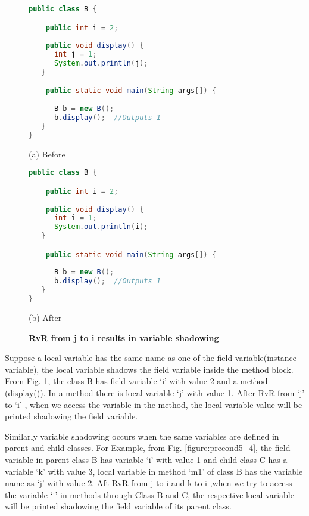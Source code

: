 \begin{figure}[th]
\centering
\begin{minipage}[t]{0.8\linewidth}
\begin{lstlisting}[language=java, basicstyle=\scriptsize\ttfamily,frame=single]
public class B {

    public int i = 2;
    
    public void display() {
      int j = 1;
      System.out.println(j); 		
   }

    public static void main(String args[]) {
    
      B b = new B();
      b.display();	//Outputs 1
   }
}
\end{lstlisting}
\centering(a) Before 
\end{minipage}
\hfill
\begin{minipage}[t]{0.8\linewidth}
\begin{lstlisting}[language=java, basicstyle=\scriptsize\ttfamily,frame=single]
public class B {

    public int i = 2;
    
    public void display() {
      int i = 1;
      System.out.println(i); 		
   }

    public static void main(String args[]) {
    
      B b = new B();
      b.display();	//Outputs 1
   }
}
\end{lstlisting}
\centering(b) After 
\end{minipage}
\caption{\textbf{RvR from j to i results in variable shadowing}}
\label{figure:precond5_3}
\end{figure}


Suppose a local variable has the same name as one of the field variable(instance variable), the local variable shadows the field variable inside the method block. From Fig. \ref{figure:precond5_3}, the class B has field variable `i' with value 2 and a method (display()). In a method there is local variable `j' with value 1. After RvR from `j' to `i' , when we access the variable in the method, the local variable value will be printed shadowing the field variable.

Similarly variable shadowing occurs when the same variables are defined in parent and child classes.
For Example, from Fig. \ref{figure:precond5_4}, the field variable  in parent class B has variable `i' with value 1 and child class C has a variable `k' with value 3, local variable in method `m1' of class B has the  variable name as `j' with value 2.  Aft RvR from j to i and k to i ,when we try to access the variable `i' in methods through Class B and C, the respective local variable will be printed shadowing the field variable of its parent class.


